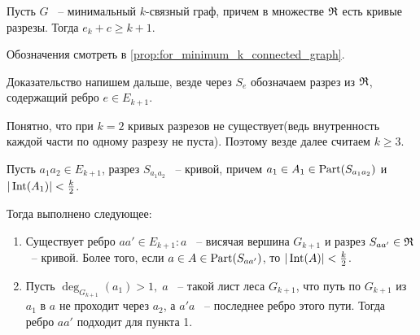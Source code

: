 \begin{customlm}{3.9} \label{lemma:3_9}
	Пусть $G$ ~-- минимальный  $k$-связный граф, причем в множестве  $\mathfrak{R}$ есть кривые разрезы.
	Тогда  $e_k + c \geqslant k + 1$.
\end{customlm}

Обозначения смотреть в \ref{prop:for_minimum_k_connected_graph}.

Доказательство напишем дальше, везде через $S_e$ обозначаем разрез из $\mathfrak{R}$, содержащий ребро $e \in E_{k + 1}$.

Понятно, что при  $k = 2$ кривых разрезов не существует(ведь внутренность каждой части по одному разрезу не пуста).
Поэтому везде далее считаем  $k \geqslant 3$.

\begin{customclaim}{1} \label{claim:3_1}
	Пусть $a_1a_2 \in E_{k + 1}$, разрез $S_{a_1 a_2}$ ~-- кривой, причем $a_1 \in A_1 \in \operatorname{Part}(S_{a_1a_2})$ и $|\operatorname{Int}(A_1)| < \frac{k}{2}$.

	Тогда выполнено следующее:

	\begin{enumerate}
		\item Существует ребро $aa' \in E_{k + 1} \colon a$ ~-- висячая вершина  $G_{k + 1}$ и разрез  $S_{aa'} \in \mathfrak{R}$ ~-- кривой. Более того, если $a \in A \in \operatorname{Part}(S_{aa'})$, то  $|\operatorname{Int}(A)| < \frac{k}{2}$.

		\item Пусть $\deg_{G_{k + 1}}(a_1) > 1, \; a$ ~-- такой лист леса  $G_{k + 1}$, что путь по  $G_{k + 1}$ из $a_1$ в $a$ не проходит через $a_2$, а $a'a$  ~-- последнее ребро этого пути. Тогда ребро  $aa'$ подходит для пункта 1.
	\end{enumerate}

\end{customclaim}



